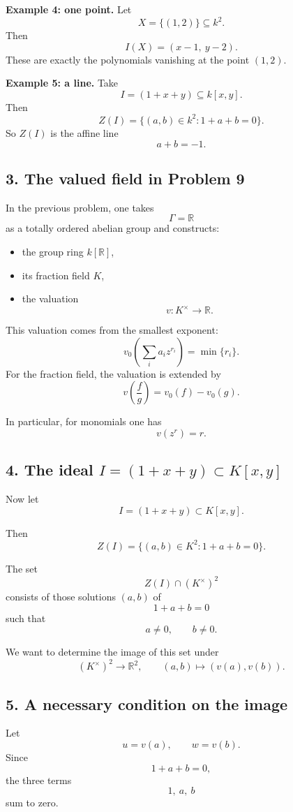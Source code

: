 \documentclass[12pt,a4paper]{article}
\theoremstyle{notespace}
\begin{document}
\textbf{Example 4: one point.}
Let
\[
X=\{(1,2)\}\subseteq k^2.
\]
Then
\[
I(X)=(x-1,\ y-2).
\]
These are exactly the polynomials vanishing at the point \((1,2)\).

\medskip

\textbf{Example 5: a line.}
Take
\[
I=(1+x+y)\subseteq k[x,y].
\]
Then
\[
Z(I)=\{(a,b)\in k^2 : 1+a+b=0\}.
\]
So \(Z(I)\) is the affine line
\[
a+b=-1.
\]

\subsection{3. The valued field in Problem 9}

In the previous problem, one takes
\[
\Gamma=\mathbb R
\]
as a totally ordered abelian group and constructs:
\begin{itemize}
	\item the group ring \(k[\mathbb R]\),
	\item its fraction field \(K\),
	\item the valuation
	\[
	v:K^\times\to \mathbb R.
	\]
\end{itemize}

This valuation comes from the smallest exponent:
\[
v_0\!\left(\sum_i a_i z^{r_i}\right)=\min\{r_i\}.
\]
For the fraction field, the valuation is extended by
\[
v\!\left(\frac{f}{g}\right)=v_0(f)-v_0(g).
\]

In particular, for monomials one has
\[
v(z^r)=r.
\]

\subsection{4. The ideal \(I=(1+x+y)\subset K[x,y]\)}

Now let
\[
I=(1+x+y)\subset K[x,y].
\]

Then
\[
Z(I)=\{(a,b)\in K^2 : 1+a+b=0\}.
\]

The set
\[
Z(I)\cap (K^\times)^2
\]
consists of those solutions \((a,b)\) of
\[
1+a+b=0
\]
such that
\[
a\neq 0,\qquad b\neq 0.
\]

We want to determine the image of this set under
\[
(K^\times)^2\to \mathbb R^2,
\qquad
(a,b)\mapsto (v(a),v(b)).
\]

\subsection{5. A necessary condition on the image}

Let
\[
u=v(a),
\qquad
w=v(b).
\]
Since
\[
1+a+b=0,
\]
the three terms
\[
1,\ a,\ b
\]
sum to zero.
\end{document}
